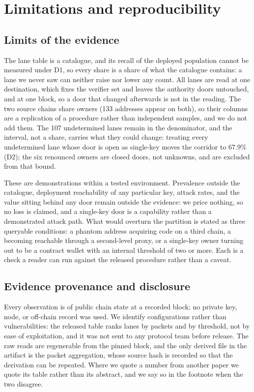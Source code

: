 \documentclass[10pt,a4paper]{article}
\newcommand{\code}[1]{\texttt{\detokenize{#1}}}
\begin{document}
\section{Limitations and reproducibility}
\label{sec:threats}

\subsection{Limits of the evidence}
The lane table is a catalogue, and its recall of the deployed population cannot be measured under
D1, so every share is a share of what the catalogue contains: a lane we never saw can neither raise nor
lower any count. All lanes are read at one destination, which fixes the verifier set and leaves the
authority doors untouched, and at one block, so a door that changed afterwards is not in the reading. The
two source chains share owners (133 addresses appear on both), so their columns are a replication of a
procedure rather than independent samples, and we do not add them. The 107 undetermined lanes remain in the
denominator, and the interval, not a share, carries what they could change: treating every undetermined lane whose door is open as single-key moves the corridor to 67.9\% (D2); the six
renounced owners are closed doors, not unknowns, and are excluded from that bound.

These are demonstrations within a tested environment. Prevalence outside the catalogue, deployment
reachability of any particular key, attack rates, and the value sitting behind any door remain outside the
evidence: we price nothing, so no loss is claimed, and a single-key door is a capability rather than a
demonstrated attack path. What would overturn the partition is stated as three queryable conditions: a
phantom address acquiring code on a third chain, a \code{getThreshold()} becoming reachable through a
second-level proxy, or a single-key owner turning out to be a contract wallet with an internal threshold of
two or more. Each is a check a reader can run against the released procedure rather than a caveat.

\subsection{Evidence provenance and disclosure}
Every observation is of public chain state at a recorded block; no private key, node, or off-chain record
was used. We identify configurations rather than vulnerabilities: the released table ranks lanes by packets and
by threshold, not by ease of exploitation, and it was not sent to any protocol team before release. The raw reads are regenerable from the pinned block, and the
only derived file in the artifact is the packet aggregation, whose source hash is recorded so that the
derivation can be repeated. Where we quote a number from another paper we quote its table rather than its
abstract, and we say so in the footnote when the two disagree.
\end{document}
